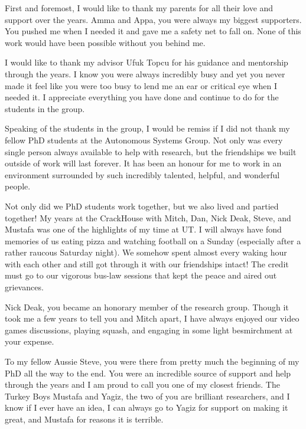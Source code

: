 \documentclass[12pt]{report}	%
\theoremstyle{definition}
\theoremstyle{remark}
\begin{document}
\begin{acknowledgments}		%
%

First and foremost, I would like to thank my parents for all their love and support over the years. Amma and Appa, you were always my biggest supporters. You pushed me when I needed it and gave me a safety net to fall on. None of this work would have been possible without you behind me.  

I would like to thank my advisor Ufuk Topcu for his guidance and mentorship through the years. I know you were always incredibly busy and yet you never made it feel like you were too busy to lend me an ear or critical eye when I needed it. I appreciate everything you have done and continue to do for the students in the group. 

Speaking of the students in the group, I would be remiss if I did not thank my fellow PhD students at the Autonomous Systems Group. Not only was every single person always available to help with research, but the friendships we built outside of work will last forever. It has been an honour for me to work in an environment surrounded by such incredibly talented, helpful, and wonderful people. 


Not only did we PhD students work together, but we also lived and partied together! My years at the CrackHouse with Mitch, Dan, Nick Deak, Steve, and Mustafa was one of the highlights of my time at UT. I will always have fond memories of us eating pizza and watching football on a Sunday (especially after a rather raucous Saturday night). We somehow spent almost every waking hour with each other and still got through it with our friendships intact! The credit must go to our vigorous bus-law sessions that kept the peace and aired out grievances. 

Nick Deak, you became an honorary member of the research group. Though it took me a few years to tell you and Mitch apart, I have always enjoyed our video games discussions, playing squash, and engaging in some light besmirchment at your expense. 

To my fellow Aussie Steve, you were there from pretty much the beginning of my PhD all the way to the end. You were an incredible source of support and help through the years and I am proud to call you one of my closest friends. The Turkey Boys Mustafa and Yagiz, the two of you are brilliant researchers, and I know if I ever have an idea, I can always go to Yagiz for support on making it great, and Mustafa for reasons it is terrible. 


\end{acknowledgments}
\end{document}
